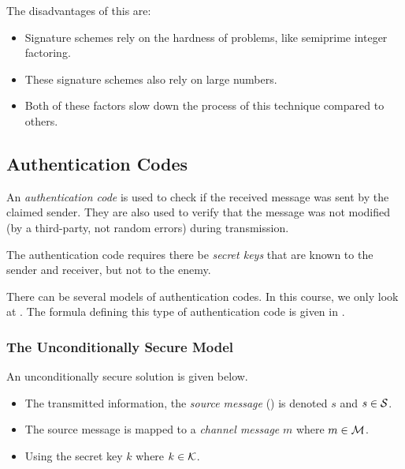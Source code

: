The disadvantages of this are:
\begin{itemize}[noitemsep]
\item Signature schemes rely on the hardness of problems, like semiprime integer factoring.
\item These signature schemes also rely on large numbers.
\item Both of these factors slow down the process of this technique compared to others.
\end{itemize}

\subsection{Authentication Codes}\label{subsec:Authentication_Codes}
\begin{definition}\label{def:Authentication_Code}
  An \emph{authentication code} is used to check if the received message was sent by the claimed sender.
  They are also used to verify that the message was not modified (by a third-party, not random errors) during transmission.

  The authentication code requires there be \emph{secret keys} that are known to the sender and receiver, but not to the enemy.

  There can be several models of authentication codes.
  In this course, we only look at .
  The formula defining this type of authentication code is given in .
\end{definition}

\subsubsection{The Unconditionally Secure Model}\label{subsubsec:Authentication_Code_Unconditionally_Secure_Model}
An unconditionally secure solution is given below.
\begin{itemize}[noitemsep]
\item The transmitted information, the \emph{source message} () is denoted $s$ and $s \in \operatorname{\mathcal{S}}$.
\item The source message is mapped to a \emph{channel message} $m$ where $m \in \operatorname{\mathcal{M}}$.
\item Using the secret key $k$ where $k \in \operatorname{\mathcal{K}}$.
\end{itemize}

